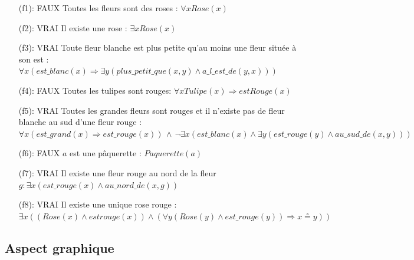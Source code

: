 \documentclass{article}
\theoremstyle{plain}
\theoremstyle{remark}
\begin{document}
\begin{itemize}
    \item [(f1): {\color{red} FAUX}] Toutes les fleurs sont des roses : $\forall x Rose(x)$
    \item [(f2): {\color{OliveGreen} VRAI}] Il existe une rose : $\exists x Rose(x)$
    \item [(f3): {\color{OliveGreen} VRAI}] Toute fleur blanche est plus petite qu'au moins une fleur située à son est : \\
$\forall x (est\_blanc(x) \Rightarrow \exists y  (plus\_petit\_que(x, y) \wedge a\_l\_est\_de(y, x)))$
	\item [(f4): {\color{red} FAUX}] Toutes les tulipes sont rouges: $\forall x Tulipe(x) \Rightarrow estRouge(x)$
    \item [(f5): {\color{OliveGreen} VRAI}] Toutes les grandes fleurs sont rouges et il n'existe pas de fleur blanche au sud d'une fleur rouge : \\
    $\forall x (est\_grand(x) \Rightarrow est\_rouge(x))\, \wedge \,\neg \exists x (est\_blanc(x) \wedge \exists y (est\_rouge(y) \wedge au\_sud\_de(x, y)))$
    \item [(f6): {\color{red} FAUX}] $a$ est une pâquerette : $Paquerette(a)$

    \item [(f7): {\color{OliveGreen} VRAI}] Il existe une fleur rouge au nord de la fleur $g : \exists x (est\_rouge(x) \wedge au\_nord\_de(x, g))$
    \item [(f8): {\color{OliveGreen} VRAI}] Il existe une unique rose rouge : \\
    $\exists x ((Rose(x) \wedge est rouge(x)) \wedge (\forall y (Rose(y) \wedge est\_rouge(y)) \Rightarrow x \circeq y))$
\end{itemize}

\subsection{Aspect graphique}
\end{document}
